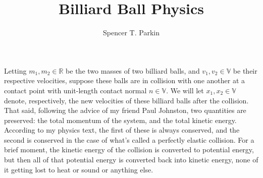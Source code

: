 \documentclass[12pt]{article}
\title{Billiard Ball Physics}
\author{Spencer T. Parkin}
\newcommand{\R}{\mathbb{R}}
\newcommand{\V}{\mathbb{V}}
\begin{document}
\maketitle

Letting $m_1,m_2\in\R$ be the two masses of two billiard balls, and $v_1,v_2\in\V$ be their respective velocities,
suppose these balls are in collision with one another at a contact point with unit-length contact normal $n\in\V$.
We will let $x_1,x_2\in\V$ denote, respectively, the new velocities of these billiard balls after the collision.
That said, following the advice of my friend Paul Johnston, two quantities are preserved: the total momentum
of the system, and the total kinetic energy.  According to my physics text, the first of these is always conserved, and
the second is conserved in the case of what's called a perfectly elastic collision.  For a brief moment, the kinetic energy
of the collision is converted to potential energy, but then all of that potential energy is converted back into kinetic energy,
none of it getting lost to heat or sound or anything else.
\end{document}
